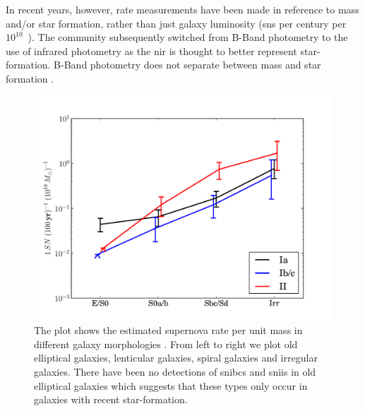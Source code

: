 In recent years, however, rate measurements have been made in reference to mass and/or star formation, rather than just galaxy luminosity (\glspl{sn} per century per $10^{10}$~\msun).  The community \citep[e.g.][]{2005A&A...433..807M} subsequently switched from B-Band photometry to the use of infrared photometry as the \gls{nir} is thought to better represent star-formation. B-Band photometry does not separate between mass and star formation \citep{2003A&A...410...83H}. 
\begin{figure}[tb] %
   \centering
   \includegraphics[width=\textwidth]{chapter_intro/plots/snrates_mannucci05.pdf} 
   \caption[Supernova rate versus galaxy morphology]{The plot shows the estimated supernova rate per unit mass in different galaxy morphologies \citep{2005A&A...433..807M}. From left to right we plot old elliptical galaxies, lenticular galaxies, spiral galaxies and irregular galaxies. There have been no detections of \glspl*{snibc} and \glspl*{snii} in old elliptical galaxies which suggests that these types only occur in galaxies with recent star-formation.}
   \label{fig:snrates_mannucci05}
\end{figure}

